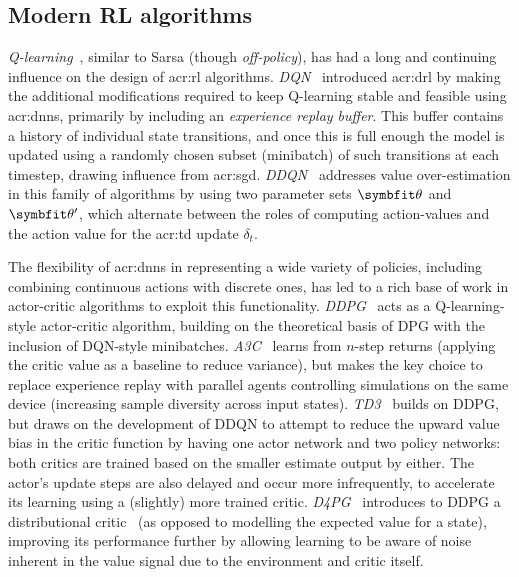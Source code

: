 \subsection{Modern RL algorithms}
\emph{Q-learning}~\parencite{WatkinsThesisQLearning}, similar to Sarsa (though \emph{off-policy}), has had a long and continuing influence on the design of \gls{acr:rl} algorithms.
\emph{DQN}~\parencite{DBLP:journals/corr/MnihKSGAWR13} introduced \gls{acr:drl} by making the additional modifications required to keep Q-learning stable and feasible using \glspl{acr:dnn}, primarily by including an \emph{experience replay buffer}.
This buffer contains a history of individual state transitions, and once this is full enough the model is updated using a randomly chosen subset (minibatch) of such transitions at each timestep, drawing influence from \gls{acr:sgd}.
\emph{DDQN}~\parencite{DBLP:conf/aaai/HasseltGS16} addresses value over-estimation in this family of algorithms by using two parameter sets $\wvec{}$ and $\wvec{}'$, which alternate between the roles of computing action-values and the action value for the \gls{acr:td} update $\delta_t$.


The flexibility of \glspl{acr:dnn} in representing a wide variety of policies, including combining continuous actions with discrete ones, has led to a rich base of work in actor-critic algorithms to exploit this functionality.
\emph{DDPG}~\parencite{DBLP:journals/corr/LillicrapHPHETS15} acts as a Q-learning-style actor-critic algorithm, building on the theoretical basis of DPG with the inclusion of DQN-style minibatches.
\emph{A3C}~\parencite{DBLP:conf/icml/MnihBMGLHSK16} learns from $n$-step returns (applying the critic value as a baseline to reduce variance), but makes the key choice to replace experience replay with parallel agents controlling simulations on the same device (increasing sample diversity across input states).
\emph{TD3}~\parencite{DBLP:conf/icml/FujimotoHM18} builds on DDPG, but draws on the development of DDQN to attempt to reduce the upward value bias in the critic function by having one actor network and two policy networks: both critics are trained based on the smaller estimate output by either.
The actor's update steps are also delayed and occur more infrequently, to accelerate its learning using a (slightly) more trained critic.
\emph{D4PG}~\parencite{DBLP:conf/iclr/Barth-MaronHBDH18} introduces to DDPG a distributional critic~\parencite{DBLP:conf/icml/BellemareDM17} (as opposed to modelling the expected value for a state), improving its performance further by allowing learning to be aware of noise inherent in the value signal due to the environment and critic itself.

